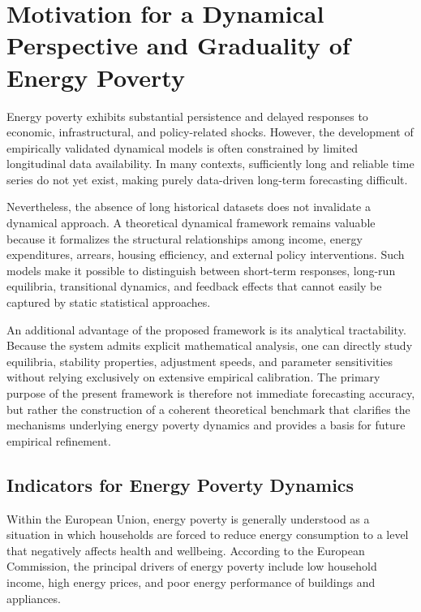 \documentclass[11pt,a4paper]{article}
\begin{document}
\section{Motivation for a Dynamical Perspective and Graduality of Energy Poverty}

Energy poverty exhibits substantial persistence and delayed responses to economic, infrastructural, and policy-related shocks. However, the development of empirically validated dynamical models is often constrained by limited longitudinal data availability. In many contexts, sufficiently long and reliable time series do not yet exist, making purely data-driven long-term forecasting difficult.

Nevertheless, the absence of long historical datasets does not invalidate a dynamical approach. A theoretical dynamical framework remains valuable because it formalizes the structural relationships among income, energy expenditures, arrears, housing efficiency, and external policy interventions. Such models make it possible to distinguish between short-term responses, long-run equilibria, transitional dynamics, and feedback effects that cannot easily be captured by static statistical approaches.

An additional advantage of the proposed framework is its analytical tractability. Because the system admits explicit mathematical analysis, one can directly study equilibria, stability properties, adjustment speeds, and parameter sensitivities without relying exclusively on extensive empirical calibration. The primary purpose of the present framework is therefore not immediate forecasting accuracy, but rather the construction of a coherent theoretical benchmark that clarifies the mechanisms underlying energy poverty dynamics and provides a basis for future empirical refinement.

\subsection{Indicators for Energy Poverty Dynamics}

Within the European Union, energy poverty is generally understood as a situation in which households are forced to reduce energy consumption to a level that negatively affects health and wellbeing. According to the European Commission, the principal drivers of energy poverty include low household income, high energy prices, and poor energy performance of buildings and appliances.
\end{document}
